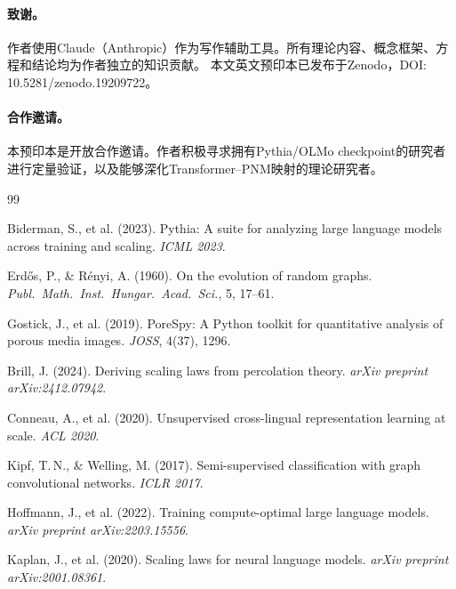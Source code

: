 \documentclass[11pt,a4paper]{article}
\begin{document}
\paragraph{致谢。}
作者使用Claude（Anthropic）作为写作辅助工具。所有理论内容、概念框架、方程和结论均为作者独立的知识贡献。
本文英文预印本已发布于Zenodo，DOI: 10.5281/zenodo.19209722。

\paragraph{合作邀请。}
本预印本是开放合作邀请。作者积极寻求拥有Pythia/OLMo checkpoint的研究者进行定量验证，以及能够深化Transformer–PNM映射的理论研究者。


\begin{thebibliography}{99}

Biderman, S., et al. (2023).
\newblock Pythia: A suite for analyzing large language models across training and scaling.
\newblock \emph{ICML 2023}.

Erd\H{o}s, P., \& R\'{e}nyi, A. (1960).
\newblock On the evolution of random graphs.
\newblock \emph{Publ.\ Math.\ Inst.\ Hungar.\ Acad.\ Sci.}, 5, 17--61.

Gostick, J., et al. (2019).
\newblock PoreSpy: A Python toolkit for quantitative analysis of porous media images.
\newblock \emph{JOSS}, 4(37), 1296.

Brill, J. (2024).
\newblock Deriving scaling laws from percolation theory.
\newblock \emph{arXiv preprint arXiv:2412.07942}.

Conneau, A., et al. (2020).
\newblock Unsupervised cross-lingual representation learning at scale.
\newblock \emph{ACL 2020}.

Kipf, T.\,N., \& Welling, M. (2017).
\newblock Semi-supervised classification with graph convolutional networks.
\newblock \emph{ICLR 2017}.

Hoffmann, J., et al. (2022).
\newblock Training compute-optimal large language models.
\newblock \emph{arXiv preprint arXiv:2203.15556}.

Kaplan, J., et al. (2020).
\newblock Scaling laws for neural language models.
\newblock \emph{arXiv preprint arXiv:2001.08361}.


\end{thebibliography}
\end{document}
